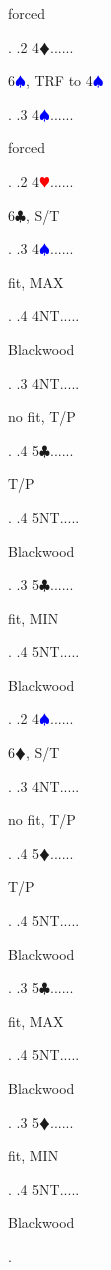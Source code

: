 \documentclass[a4paper]{article}
\newcommand{\BC}{\textcolor{OliveGreen}{$\clubsuit$}}
\newcommand{\BD}{\textcolor{RedOrange}{$\vardiamondsuit$}}
\newcommand{\BH}{\textcolor{Red}{$\varheartsuit${}}}
\newcommand{\BS}{\textcolor{Blue}{$\spadesuit${}}}
\begin{document}
{\begin{minipage}[t]{0.8\textwidth}
forced
\end{minipage}. 
 .2 4\BD......\begin{minipage}[t]{0.8\textwidth}
6\BS , TRF to 4\BS 
\end{minipage}. 
 .3 4\BS......\begin{minipage}[t]{0.8\textwidth}
forced
\end{minipage}. 
 .2 4\BH......\begin{minipage}[t]{0.8\textwidth}
6\BC , S/T
\end{minipage}. 
 .3 4\BS......\begin{minipage}[t]{0.8\textwidth}
fit, MAX
\end{minipage}. 
 .4 4NT.....\begin{minipage}[t]{0.8\textwidth}
Blackwood
\end{minipage}. 
 .3 4NT.....\begin{minipage}[t]{0.8\textwidth}
no fit, T/P
\end{minipage}. 
 .4 5\BC......\begin{minipage}[t]{0.8\textwidth}
T/P
\end{minipage}. 
 .4 5NT.....\begin{minipage}[t]{0.8\textwidth}
Blackwood
\end{minipage}. 
 .3 5\BC......\begin{minipage}[t]{0.8\textwidth}
fit, MIN
\end{minipage}. 
 .4 5NT.....\begin{minipage}[t]{0.8\textwidth}
Blackwood
\end{minipage}. 
 .2 4\BS......\begin{minipage}[t]{0.8\textwidth}
6\BD , S/T
\end{minipage}. 
 .3 4NT.....\begin{minipage}[t]{0.8\textwidth}
no fit, T/P
\end{minipage}. 
 .4 5\BD......\begin{minipage}[t]{0.8\textwidth}
T/P
\end{minipage}. 
 .4 5NT.....\begin{minipage}[t]{0.8\textwidth}
Blackwood
\end{minipage}. 
 .3 5\BC......\begin{minipage}[t]{0.8\textwidth}
fit, MAX
\end{minipage}. 
 .4 5NT.....\begin{minipage}[t]{0.8\textwidth}
Blackwood
\end{minipage}. 
 .3 5\BD......\begin{minipage}[t]{0.8\textwidth}
fit, MIN
\end{minipage}. 
 .4 5NT.....\begin{minipage}[t]{0.8\textwidth}
Blackwood
\end{minipage}. 
}
\bigbreak
\end{document}
